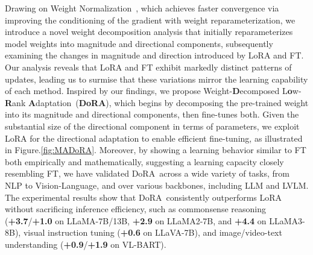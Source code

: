 \documentclass{article}
\newcommand{\oursfullbold}{Weight-\textbf{D}ecomposed L\textbf{o}w-\textbf{R}ank \textbf{A}daptation}
\newcommand{\ours}{DoRA}
\theoremstyle{plain}
\theoremstyle{definition}
\theoremstyle{remark}
\def\authornote#1#2#3{{\textcolor{#2}{\textsl{\small[#1: #3]}}}}
\newcommand{\PM}[1]{\authornote{Pavlo}{blue}{#1}}
\begin{document}
Drawing on Weight Normalization~\cite{salimans2016weight}, which achieves faster convergence via improving the conditioning of the gradient with weight reparameterization, we introduce a novel weight decomposition analysis that initially reparameterizes model weights into magnitude and directional components, subsequently examining the changes in magnitude and direction introduced by LoRA and FT. Our analysis reveals that LoRA and FT exhibit markedly distinct patterns of updates, leading us to surmise that these variations mirror the learning capability of each method. Inspired by our findings, we propose \oursfullbold~(\textbf{\ours}), which begins by decomposing the pre-trained weight into its magnitude and directional components, then fine-tunes both. Given the substantial size of the directional component in terms of parameters, we exploit LoRA for the directional adaptation to enable efficient fine-tuning, as illustrated in Figure.\ref{fig:MADoRA}.
Moreover, by showing a learning behavior similar to FT both empirically and mathematically, suggesting a learning capacity closely resembling FT, we have validated \ours~across a wide variety of tasks, from NLP to Vision-Language, and over various backbones, including LLM and LVLM. The experimental results show that \ours~consistently outperforms LoRA without sacrificing inference efficiency, such as commonsense reasoning (\textbf{+3.7}/\textbf{+1.0} on LLaMA-7B/13B, \textbf{+2.9} on LLaMA2-7B, and \textbf{+4.4} on LLaMA3-8B), visual instruction tuning (\textbf{+0.6} on LLaVA-7B), and image/video-text understanding (\textbf{+0.9}/\textbf{+1.9} on VL-BART). 

\end{document}
